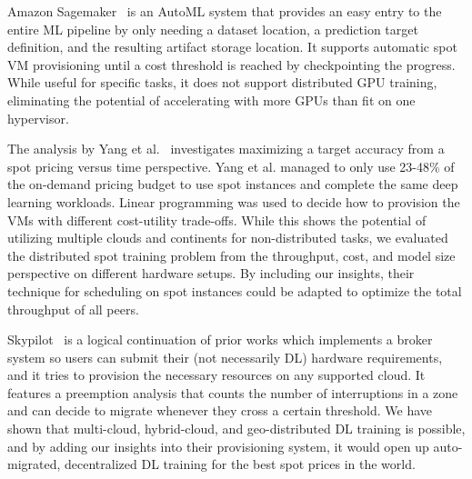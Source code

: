 Amazon Sagemaker~\cite{das2020sagemaker} is an AutoML system that provides an easy entry to the entire ML pipeline by only needing a dataset location, a prediction target definition, and the resulting artifact storage location.
It supports automatic spot VM provisioning until a cost threshold is reached by checkpointing the progress.
While useful for specific tasks, it does not support distributed GPU training, eliminating the potential of accelerating with more GPUs than fit on one hypervisor.

The analysis by Yang et al.~\cite{yang2022schedulingml} investigates maximizing a target accuracy from a spot pricing versus time perspective.
Yang et al. managed to only use 23-48\% of the on-demand pricing budget to use spot instances and complete the same deep learning workloads.
Linear programming was used to decide how to provision the VMs with different cost-utility trade-offs.
While this shows the potential of utilizing multiple clouds and continents for non-distributed tasks, we evaluated the distributed spot training problem from the throughput, cost, and model size perspective on different hardware setups.
By including our insights, their technique for scheduling on spot instances could be adapted to optimize the total throughput of all peers.

Skypilot~\cite{yang2023skypilot} is a logical continuation of prior works which implements a broker system so users can submit their (not necessarily DL) hardware requirements, and it tries to provision the necessary resources on any supported cloud.
It features a preemption analysis that counts the number of interruptions in a zone and can decide to migrate whenever they cross a certain threshold.
We have shown that multi-cloud, hybrid-cloud, and geo-distributed DL training is possible, and by adding our insights into their provisioning system, it would open up auto-migrated, decentralized DL training for the best spot prices in the world.